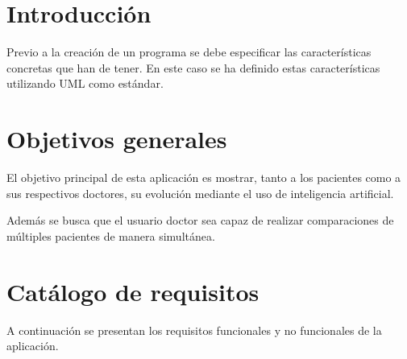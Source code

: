 

\section{Introducción}
Previo a la creación de un programa se debe especificar las características concretas que han de tener.
En este caso se ha definido estas características utilizando UML como estándar.



\section{Objetivos generales}
El objetivo principal de esta aplicación es mostrar, tanto a los pacientes como a sus respectivos doctores, su evolución mediante el uso de inteligencia artificial.

Además se busca que el usuario doctor sea capaz de realizar comparaciones de múltiples pacientes de manera simultánea.

\section{Catálogo de requisitos}
A continuación se presentan los requisitos funcionales y no funcionales de la aplicación.
